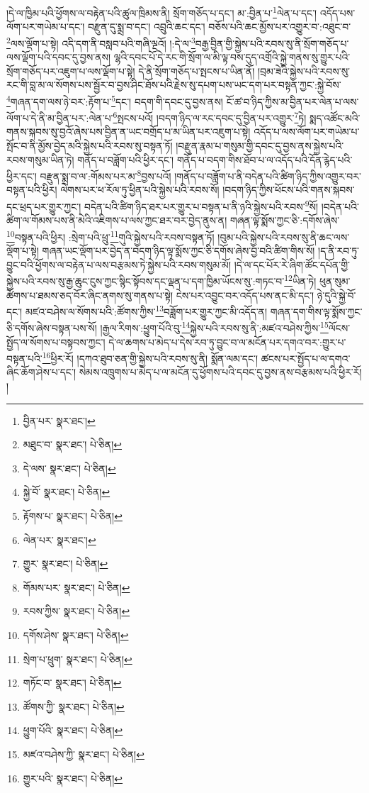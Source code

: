 །དེ་ལ་ཁྱིམ་པའི་ཕྱོགས་ལ་བརྟེན་པའི་ཚུལ་ཁྲིམས་ནི། སྲོག་གཅོད་པ་དང་། མ་:བྱིན་པ་\footnote{བྱིན་པར་  སྣར་ཐང་། }ལེན་པ་དང་། འདོད་པས་ལོག་པར་གཡེམ་པ་དང་། བརྫུན་དུ་སྨྲ་བ་དང་། འབྲུའི་ཆང་དང་། བཅོས་པའི་ཆང་མྱོས་པར་འགྱུར་བ་:འཐུང་བ་\footnote{མཐུང་བ་  སྣར་ཐང་།  པེ་ཅིན། }ལས་ལྡོག་པ་སྟེ། འདི་དག་ནི་བསླབ་པའི་གཞི་ལྔའོ། །:དེ་ལ་\footnote{དེ་ལས་  སྣར་ཐང་།  པེ་ཅིན། }བརྒྱ་བྱིན་གྱི་སྐྱེས་པའི་རབས་སུ་ནི་སྲོག་གཅོད་པ་ལས་ལྡོག་པའི་དབང་དུ་བྱས་ནས། ལྷའི་དབང་པོ་དེ་རང་གི་སྲོག་ལ་མི་ལྟ་བས་དུད་འགྲོའི་སྐྱེ་གནས་སུ་གྱུར་པའི་སྲོག་གཅོད་པར་འཇུག་པ་ལས་ལྡོག་པ་སྟེ། དེ་ནི་སྲོག་གཅོད་པ་སྤངས་པ་ཡིན་ནོ། །བྲམ་ཟེའི་སྐྱེས་པའི་རབས་སུ་རང་གི་བླ་མ་ལ་སོགས་པས་སྦྱོར་བ་བྱས་ཤིང་ཐོས་པའི་རྗེས་སུ་དཔག་པས་ཡང་དག་པར་བསྟན་ཀྱང་:སྐྱེ་བོས་\footnote{སྐྱེ་བོ་  སྣར་ཐང་།  པེ་ཅིན། }གཞན་དག་ལས་ཉེ་བར་:རྟོག་པ་\footnote{རྟོགས་པ་  སྣར་ཐང་།  པེ་ཅིན། }དང་། བདག་གི་དབང་དུ་བྱས་ནས། ངོ་ཚ་བ་ཉིད་ཀྱིས་མ་བྱིན་པར་ལེན་པ་ལས་ལོག་པ་དེ་ནི་མ་བྱིན་པར་:ལེན་པ་\footnote{ལེན་པར་  སྣར་ཐང་། }སྤངས་པའོ། །བདག་ཉིད་ལ་རང་དབང་དུ་བྱིན་པར་འགྱུར་\footnote{གྱུར་  སྣར་ཐང་།  པེ་ཅིན། }ཏེ། སྨད་འཚོང་མའི་གནས་སྐབས་སུ་བྱའོ་ཞེས་པས་བྱིན་ན་ཡང་བགྲོད་པ་མ་ཡིན་པར་འཇུག་པ་སྟེ། འདོད་པ་ལས་ལོག་པར་གཡེམ་པ་སྤོང་བ་ནི་མྱོས་བྱེད་མའི་སྐྱེས་པའི་རབས་སུ་བསྟན་ཏོ། །བརྫུན་རྣམ་པ་གསུམ་གྱི་དབང་དུ་བྱས་ནས་སྐྱེས་པའི་རབས་གསུམ་ཡིན་ཏེ། གནོད་པ་བཟློག་པའི་ཕྱིར་དང་། གནོད་པ་བདག་གིས་ཐོབ་པ་ལ་འདོད་པའི་དོན་རྙེད་པའི་ཕྱིར་དང་། བརྫུན་སྨྲ་བ་ལ་:གོམས་པར་མ་\footnote{གོམས་པར་  སྣར་ཐང་།  པེ་ཅིན། }བྱས་པའོ། །གནོད་པ་བཟློག་པ་ནི་བདེན་པའི་ཚིག་ཉིད་ཀྱིས་འགྱུར་བར་བསྟན་པའི་ཕྱིར། ལེགས་པར་ཕ་རོལ་ཏུ་ཕྱིན་པའི་སྐྱེས་པའི་རབས་སོ། །བདག་ཉིད་ཀྱིས་ཕོངས་པའི་གནས་སྐབས་དང་ཕྲད་པར་གྱུར་ཀྱང་། བདེན་པའི་ཚིག་ཉིད་ཐར་པར་གྱུར་པ་བསྟན་པ་ནི་ཉའི་སྐྱེས་པའི་རབས་\footnote{རབས་ཀྱིས་  སྣར་ཐང་།  པེ་ཅིན། }སོ། །བདེན་པའི་ཚིག་ལ་གོམས་པས་ནི་མེའི་འཇིགས་པ་ལས་ཀྱང་ཐར་བར་བྱེད་ནུས་ན། གཞན་ལྟ་སྨོས་ཀྱང་ཅི་:དགོས་ཞེས་\footnote{དགོས་ཤེས་  སྣར་ཐང་།  པེ་ཅིན། }བསྟན་པའི་ཕྱིར། :སྲེག་པའི་ཕྲུ་\footnote{སྲེག་པ་ཕྲུག་  སྣར་ཐང་།  པེ་ཅིན། }གུའི་སྐྱེས་པའི་རབས་བསྟན་ཏོ། །བུམ་པའི་སྐྱེས་པའི་རབས་སུ་ནི་ཆང་ལས་ལྡོག་པ་སྟེ། གཞན་ཡང་ལྡོག་པར་བྱེད་ན་བདག་ཉིད་ལྟ་སྨོས་ཀྱང་ཅི་དགོས་ཞེས་བྱ་བའི་ཚིག་གིས་སོ། །ད་ནི་རབ་ཏུ་བྱུང་བའི་ཕྱོགས་ལ་བརྟེན་པ་ལས་བརྩམས་ཏེ་སྐྱེས་པའི་རབས་གསུམ་མོ། །དེ་ལ་དང་པོར་རེ་ཞིག་ཚོང་དཔོན་གྱི་སྐྱེས་པའི་རབས་སུ་རྒྱ་ཆུང་ངུས་ཀྱང་སྙིང་སྟོབས་དང་ལྡན་པ་དག་ཁྱིམ་ཡོངས་སུ་:གཏང་བ་\footnote{གཏོང་བ་  སྣར་ཐང་།  པེ་ཅིན། }ཡིན་ཏེ། ཕུན་སུམ་ཚོགས་པ་ཐམས་ཅད་བོར་ཞིང་ནགས་སུ་གནས་པ་སྟེ། ངེས་པར་འབྱུང་བར་འདོད་པས་ནང་མི་དང་། ཉེ་དུའི་སྐྱེ་བོ་དང་། མཛའ་བཤེས་ལ་སོགས་པའི་:ཚོགས་ཀྱིས་\footnote{ཚོགས་ཀྱི་  སྣར་ཐང་།  པེ་ཅིན། }བཟློག་པར་གྱུར་ཀྱང་མི་འདོད་ན། གཞན་དག་གིས་ལྟ་སྨོས་ཀྱང་ཅི་དགོས་ཞེས་བསྟན་པས་སོ། །རྒྱལ་རིགས་:ཕྱུག་པོའི་བུ་\footnote{ཕྱུག་པོའི་  སྣར་ཐང་།  པེ་ཅིན། }སྐྱེས་པའི་རབས་སུ་ནི་:མཛའ་བཤེས་ཀྱིས་\footnote{མཛའ་བཤེས་ཀྱི་  སྣར་ཐང་།  པེ་ཅིན། }ལོངས་སྤྱོད་ལ་སོགས་པ་བསྟབས་ཀྱང་། དེ་ལ་ཆགས་པ་མེད་པ་དེས་རབ་ཏུ་བྱུང་བ་ལ་མངོན་པར་དགའ་བར་:གྱུར་པ་བསྟན་པའི་\footnote{གྱུར་པའི་  སྣར་ཐང་།  པེ་ཅིན། }ཕྱིར་རོ། །དཀའ་ཐུབ་ཅན་གྱི་སྐྱེས་པའི་རབས་སུ་ནི། སྨོན་ལམ་དང་། ཚངས་པར་སྤྱོད་པ་ལ་དགའ་ཞིང་ཆོག་ཤེས་པ་དང་། སེམས་འཁྲུགས་པ་མེད་པ་ལ་མངོན་དུ་ཕྱོགས་པའི་དབང་དུ་བྱས་ནས་བརྩམས་པའི་ཕྱིར་རོ། །
